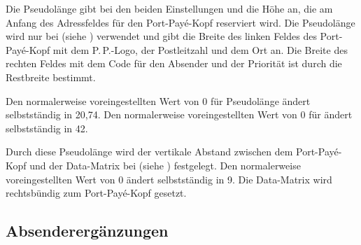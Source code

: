\begin{Declaration}
\end{Declaration}
Die Pseudolänge  gibt bei den beiden
Einstellungen
%
 und
%
 die Höhe an, die am
Anfang des Adressfeldes für den Port-Payé-Kopf reserviert wird. Die
Pseudolänge  wird nur bei
 (siehe
) verwendet und gibt die Breite des
linken Feldes des Port-Payé-Kopf mit dem P.\,P.-Logo, der Postleitzahl und dem
Ort an. Die Breite des rechten Feldes mit dem Code für den Absender und der
Priorität ist durch die Restbreite bestimmt.

Den normalerweise voreingestellten Wert von
0 für Pseudolänge  ändert \KOMAScript{}
selbstständig in 20,74. Den normalerweise voreingestellten Wert von
0 für  ändert \KOMAScript{} selbstständig in
42.%
%
\EndIndexGroup


\begin{Declaration}
\end{Declaration}
Durch diese Pseudolänge wird der vertikale
Abstand zwischen dem Port-Payé-Kopf und der Data-Matrix bei
%
%
 (siehe
)
festgelegt. Den normalerweise
voreingestellten Wert von 0 ändert \KOMAScript{} selbstständig in
9. Die Data-Matrix wird rechtsbündig zum Port-Payé-Kopf gesetzt.%
\EndIndexGroup
%
\EndIndexGroup


\subsection{Absenderergänzungen}
\BeginIndexGroup
{}%

